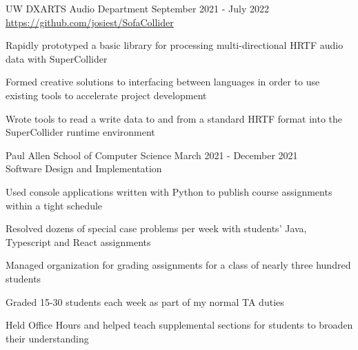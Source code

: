 \documentclass[10pt]{article}
\newenvironment{itemize*}
{\begin{itemize}[leftmargin=*]
    \setlength{\parskip}{0.5pt}}
{\end{itemize}}
\begin{document}
\begin{description}[leftmargin=!,
                    labelwidth=\widthof{\bfseries SuperCollider Audio
                                                  Programming Study}]
\item[SuperCollider Audio Programming Study]
    UW DXARTS Audio Department  \hfill September 2021 - July 2022\\
    \url{https://github.com/josiest/SofaCollider}
    
\end{description}
\begin{itemize*}
\item Rapidly prototyped a basic library for processing multi-directional HRTF audio data with SuperCollider
\item Formed creative solutions to interfacing between languages in order to
    use existing tools to accelerate project development
\item Wrote tools to read a write data to and from a standard HRTF format into
    the SuperCollider runtime environment
\end{itemize*}
\vspace{10pt}

\begin{description}[leftmargin=!,
                    labelwidth=\widthof{\bfseries Teaching Assistant}]

\item[Teaching Assistant] Paul Allen School of Computer Science \hfill 
    March 2021 - December 2021\\
    Software Design and Implementation
\end{description}
\begin{itemize*}
\item Used console applications written with Python to publish course
      assignments within a tight schedule
\item Resolved dozens of special case problems per week with students' Java,
      Typescript and React assignments
\item Managed organization for grading assignments for a class of nearly three
      hundred students
\item Graded 15-30 students each week as part of my normal TA duties
\item Held Office Hours and helped teach supplemental sections for students to
      broaden their understanding
\end{itemize*}
\vspace{10pt}
\end{document}
